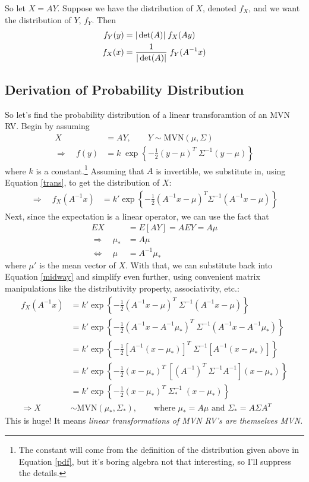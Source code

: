 \documentclass[a4paper,12pt]{scrartcl}
\begin{document}
So let $X = A{Y}$. Suppose we have the distribution of
$X$, denoted $f_{{X}}$, and we want the distribution
of ${Y}$, $f_{{Y}}$. Then
\begin{align}
    f_{{Y}}(y) &= |\det(A)| \; f_{{X}}(Ay) \notag \\
    f_{{X}}(x) &= \frac{1}{|\det(A)|} \; f_{{Y}}(A^{-1} x) 
	\label{trans}
\end{align}

\newpage
\subsection{Derivation of Probability Distribution}

So let's find the probability distribution of a linear transforamtion
of an MVN RV. Begin by assuming 
\begin{align*}
    X &= A{Y}, \qquad {Y} \sim 
	\text{MVN}(\mu, \Sigma) \\
    \Rightarrow \quad f(y) &= k \; \exp\left\{-\frac{1}{2} (y - \mu)^T 
	\; \Sigma^{-1} (y-\mu)\right\}
\end{align*}
where $k$ is a constant.\footnote{The constant will come from the
definition of the distribution given above in Equation \ref{pdf}, but
it's boring algebra not that interesting, so I'll suppress the details.}
Assuming that $A$ is invertible, we substitute in, using Equation 
\ref{trans}, to get the distribution of $X$:
\begin{align}
    \label{midway}
    \Rightarrow \quad f_X(A^{-1}x) &= k' \exp\left\{-\frac{1}{2} (A^{-1}x - \mu)^T 
	\Sigma^{-1} (A^{-1}x-\mu)\right\} 
\end{align}
Next, since the expectation is a linear operator, we can use the fact
that 
\begin{align*}
    EX &= E[A{Y}] = A E{Y} = A \mu \\
    \Rightarrow \quad \mu_* &= A \mu \\
    \Leftrightarrow \quad \mu &= A^{-1} \mu_*
\end{align*}
where $\mu'$ is the mean vector of $X$.  With that, we
can substitute back into Equation \ref{midway} and simplify even
further, using convenient matrix manipulations like the distributivity
property, associativity, etc.:
\begin{align*}
    f_X(A^{-1}x) &= k' \exp\left\{-\frac{1}{2} (A^{-1}x - \mu)^T \;
	\Sigma^{-1} (A^{-1}x-\mu)\right\} \\
    &= k' \exp\left\{-\frac{1}{2} (A^{-1}x - A^{-1}\mu_*)^T \;
	\Sigma^{-1} (A^{-1}x-A^{-1}\mu_*)\right\} \\
    &= k' \exp\left\{-\frac{1}{2} [A^{-1}(x - \mu_*)]^T \;
	\Sigma^{-1} [A^{-1}(x-\mu_*)]\right\} \\
    &= k' \exp\left\{-\frac{1}{2} (x - \mu_*)^T \; [(A^{-1})^T \;
	\Sigma^{-1} A^{-1}] (x-\mu_*)\right\} \\
    &= k' \exp\left\{-\frac{1}{2} (x - \mu_*)^T \;  
	\Sigma_*^{-1} \; (x-\mu_*)\right\} \\
    \Rightarrow X &\sim  \text{MVN}(\mu_*, \Sigma_*), 
    \qquad \text{where $\mu_* = A\mu$ and $\Sigma_* = A\Sigma A^T $}
\end{align*}
This is huge! It means \emph{linear transformations of MVN
RV's are themselves MVN.}
\end{document}
